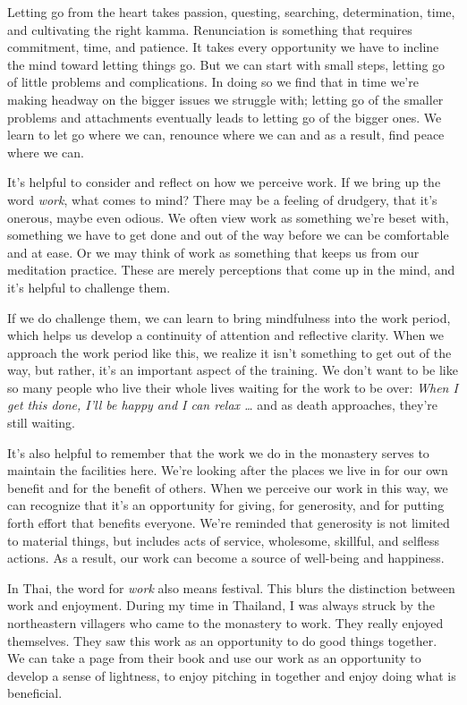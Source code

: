 Letting go from the heart takes passion, questing, searching, 
determination, time, and cultivating the right kamma. Renunciation is 
something that requires commitment, time, and patience. It takes every 
opportunity we have to incline the mind toward letting things go. But 
we can start with small steps, letting go of little problems and 
complications. In doing so we find that in time we're making headway on 
the bigger issues we struggle with; letting go of the smaller problems 
and attachments eventually leads to letting go of the bigger ones. We 
learn to let go where we can, renounce where we can and as a result, 
find peace where we can.


It's helpful to consider and reflect on how we perceive work. If we 
bring up the word \emph{work}, what comes to mind? There may be a 
feeling of drudgery, that it's onerous, maybe even odious. We often 
view work as something we're beset with, something we have to get done 
and out of the way before we can be comfortable and at ease. Or we may 
think of work as something that keeps us from our meditation practice. 
These are merely perceptions that come up in the mind, and it's helpful 
to challenge them.

If we do challenge them, we can learn to bring mindfulness into the 
work period, which helps us develop a continuity of attention and 
reflective clarity. When we approach the work period like this, we 
realize it isn't something to get out of the way, but rather, it's an 
important aspect of the training. We don't want to be like so many 
people who live their whole lives waiting for the work to be over: 
\emph{When I get this done, I'll be happy and I can relax \ldots{}} and 
as death approaches, they're still waiting.

It's also helpful to remember that the work we do in the monastery 
serves to maintain the facilities here. We're looking after the places 
we live in for our own benefit and for the benefit of others. When we 
perceive our work in this way, we can recognize that it's an 
opportunity for giving, for generosity, and for putting forth effort 
that benefits everyone. We're reminded that generosity is not limited 
to material things, but includes acts of service, wholesome, skillful, 
and selfless actions. As a result, our work can become a source of 
well-being and happiness.

In Thai, the word for \emph{work} also means festival. This blurs the 
distinction between work and enjoyment. During my time in Thailand, I 
was always struck by the northeastern villagers who came to the 
monastery to work. They really enjoyed themselves. They saw this work 
as an opportunity to do good things together. We can take a page from 
their book and use our work as an opportunity to develop a sense of 
lightness, to enjoy pitching in together and enjoy doing what is 
beneficial.

